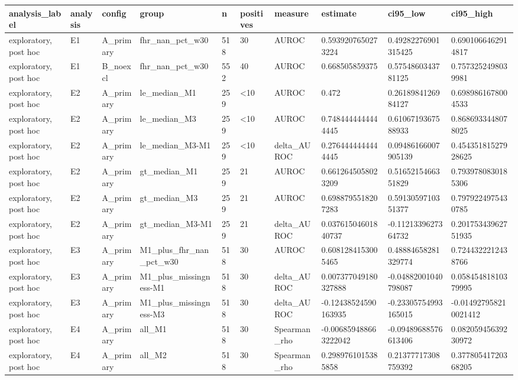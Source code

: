 \begin{tabular}{llllllllll}
\toprule
analysis\_label & analysis & config & group & n & positives & measure & estimate & ci95\_low & ci95\_high \\
\midrule
exploratory, post hoc & E1 & A\_primary & fhr\_nan\_pct\_w30 & 518 & 30 & AUROC & 0.5939207650273224 & 0.49282276901315425 & 0.6901066462914817 \\
exploratory, post hoc & E1 & B\_noexcl & fhr\_nan\_pct\_w30 & 552 & 40 & AUROC & 0.668505859375 & 0.5754860343781125 & 0.7573252498039981 \\
exploratory, post hoc & E2 & A\_primary & le\_median\_M1 & 259 & <10 & AUROC & 0.472 & 0.2618984126984127 & 0.6989861678004533 \\
exploratory, post hoc & E2 & A\_primary & le\_median\_M3 & 259 & <10 & AUROC & 0.7484444444444445 & 0.6106719367588933 & 0.8686933448078025 \\
exploratory, post hoc & E2 & A\_primary & le\_median\_M3-M1 & 259 & <10 & delta\_AUROC & 0.2764444444444445 & 0.09486166007905139 & 0.45435181527928625 \\
exploratory, post hoc & E2 & A\_primary & gt\_median\_M1 & 259 & 21 & AUROC & 0.6612645058023209 & 0.5165215466351829 & 0.7939780830185306 \\
exploratory, post hoc & E2 & A\_primary & gt\_median\_M3 & 259 & 21 & AUROC & 0.6988795518207283 & 0.5913059710351377 & 0.7979224975430785 \\
exploratory, post hoc & E2 & A\_primary & gt\_median\_M3-M1 & 259 & 21 & delta\_AUROC & 0.03761504601840737 & -0.1121339627364732 & 0.20175343962751935 \\
exploratory, post hoc & E3 & A\_primary & M1\_plus\_fhr\_nan\_pct\_w30 & 518 & 30 & AUROC & 0.6081284153005465 & 0.48884658281329774 & 0.7244322212438766 \\
exploratory, post hoc & E3 & A\_primary & M1\_plus\_missingness-M1 & 518 & 30 & delta\_AUROC & 0.007377049180327888 & -0.04882001040798087 & 0.05845481810379995 \\
exploratory, post hoc & E3 & A\_primary & M1\_plus\_missingness-M3 & 518 & 30 & delta\_AUROC & -0.12438524590163935 & -0.23305754993165015 & -0.014927958210021412 \\
exploratory, post hoc & E4 & A\_primary & all\_M1 & 518 & 30 & Spearman\_rho & -0.006859488663222042 & -0.09489688576613406 & 0.08205945639230972 \\
exploratory, post hoc & E4 & A\_primary & all\_M2 & 518 & 30 & Spearman\_rho & 0.2989761015385858 & 0.21377717308759392 & 0.37780541720368205 \\

\end{tabular}
